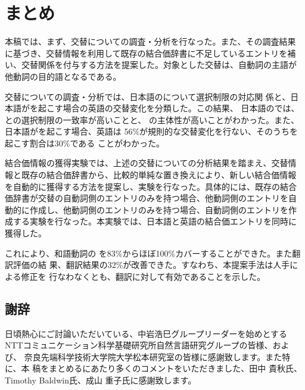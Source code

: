 \documentclass[japanese]{jnlp}
\newcommand{\abs}{}
\newcommand{\sbj}{}
\newcommand{\obj}{}
\newcommand{\soalt}{}
\begin{document}
\section{まとめ} \label{sec:conclusion}


本稿では、まず、交替についての調査・分析を行なった。また、その調査結果
に基づき、交替情報を利用して既存の結合価辞書に不足しているエントリを補
い、交替関係を付与する方法を提案した。対象とした交替は、自動詞の主語が
他動詞の目的語となる\soalt{}である。

交替についての調査・分析では、日本語の\soalt について選択制限の対応関
係と、日本語が\soalt を起こす場合の英語の交替変化を分類した。この結果、
日本語の\soalt では、\sbj と\obj の選択制限の一致率が高いことと、\abs 
の主体性が高いことがわかった。また、日本語が\soalt を起こす場合、英語は
56\%が規則的な交替変化を行ない、そのうち\soalt を起こす割合は30\%である
ことがわかった。



結合価情報の獲得実験では、上述の交替についての分析結果を踏まえ、交替情
報と既存の結合価辞書から、比較的単純な置き換えにより、新しい結合価情報
を自動的に獲得する方法を提案し、実験を行なった。具体的には、既存の結合
価辞書が交替の自動詞側のエントリのみを持つ場合、他動詞側のエントリを自
動的に作成し、他動詞側のエントリのみを持つ場合、自動詞側のエントリを作
成する実験を行なった。本実験では、日本語と英語の結合価エントリを同時に
獲得した。

これにより、和語動詞の\soalt
を83\%からほぼ100\%カバーすることができた。また翻訳評価の結
果、翻訳結果の32\%が改善できた。すなわち、本提案手法は人手による修正を
行なわなくとも、翻訳に対して有効であることを示した。



\subsection*{謝辞}
 
日頃熱心にご討論いただいている、中岩浩巳グループリーダーを始めとする
NTTコミュニケーション科学基礎研究所自然言語研究グループの皆様、および、
奈良先端科学技術大学院大学松本研究室の皆様に感謝致します。また特に、本
稿をまとめるにあたり多くのコメントをいただきました、田中 貴秋氏、
Timothy Baldwin氏、成山 重子氏に感謝致します。
\end{document}
